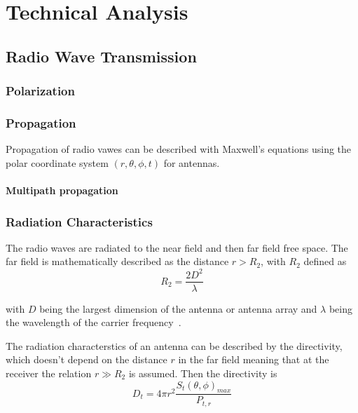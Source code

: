 \chapter{Technical Analysis}

\section{Radio Wave Transmission}

\subsection{Polarization}

\subsection{Propagation}
Propagation of radio vawes can be described with Maxwell's equations using the polar coordinate system $\left( r, \theta, \phi, t \right)$ for antennas. 




\subsubsection{Multipath propagation}


\subsection{Radiation Characteristics}
The radio waves are radiated to the near field and then far field free space. The far field is mathematically described as the distance $r>R_2$, with $R_2$ defined as
\begin{equation} \label{eq:far_field}
    R_2 = \frac{2 D^2}{\lambda}
\end{equation}

with $D$ being the largest dimension of the antenna or antenna array and $\lambda$ being the wavelength of the carrier frequency~\cite[p. 4]{ant_beam_form}.

The radiation characterstics of an antenna can be described by the directivity, which doesn't depend on the distance $r$ in the far field meaning that at the receiver the relation $r \gg  R_2$ is assumed. Then the directivity is
\begin{equation} \label{eq:directivity}
    D_t = 4 \pi r^2 \frac{S_t \left(\theta, \phi\right)_{max}}{P_{t,r}}
\end{equation}

